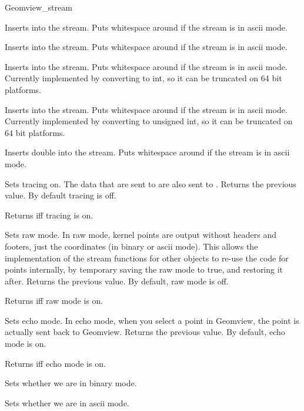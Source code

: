 \begin{ccRefClass}{Geomview_stream}
\begin{ccAdvanced}
{Inserts  into the stream. Puts whitespace around if the
stream is in ascii mode.}

{Inserts  into the stream. Puts whitespace around if the
stream is in ascii mode.}

{Inserts  into the stream. Puts whitespace around if the
stream is in ascii mode. Currently implemented by converting to int, so it
can be truncated on 64 bit platforms.}

{Inserts  into the stream. Puts whitespace around if the
stream is in ascii mode. Currently implemented by converting to unsigned int,
so it can be truncated on 64 bit platforms.}

{Inserts double  into the stream. Puts whitespace around if the
stream is in ascii mode.}

{Sets tracing on. The data that are sent to  are also
 sent to .  Returns the previous value. By default tracing is
 off.}

{Returns  iff tracing is on.}

{Sets raw mode.  In raw mode, kernel points are output without headers and
 footers, just the coordinates (in binary or ascii mode).  This allows the
 implementation of the stream functions for other objects to re-use the
 code for points internally, by temporary saving the raw mode to true, and
 restoring it after.
   Returns the previous value. By default, raw mode is off.}

{Returns  iff raw mode is on.}

{Sets echo mode.  In echo mode, when you select a point in Geomview, the point
 is actually sent back to Geomview.
 Returns the previous value. By default, echo mode is on.}

{Returns  iff echo mode is on.}

{Sets whether we are in binary mode.}

{Sets whether we are in ascii mode.}


\end{ccAdvanced}
\end{ccRefClass}
